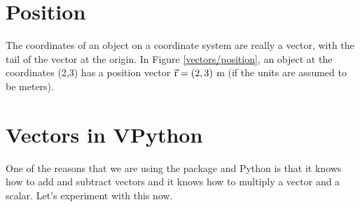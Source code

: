 
\section*{Position}

The coordinates of an object on a coordinate system are really a vector, with the tail of the vector at the origin. In Figure \ref{vectors/position}, an object at the coordinates (2,3) has a position vector $\vec{\mathrm{r}}=(2,3)$ m (if the units are assumed to be meters). 


\section*{Vectors in VPython}

One of the reasons that we are using the  package and Python is that it knows how to add and subtract vectors and it knows how to multiply a vector and a scalar. Let's experiment with this now.

